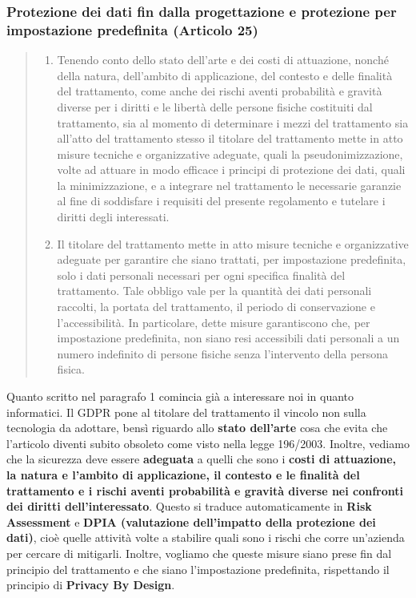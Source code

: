 \subsubsection*{Protezione dei dati fin dalla progettazione e protezione per impostazione predefinita (Articolo 25)}
\begin{quote}
    \begin{enumerate}
        \item Tenendo conto dello stato dell'arte e dei costi di attuazione, nonché della natura, dell'ambito di applicazione, del contesto e delle finalità del trattamento, come anche dei rischi aventi probabilità e gravità diverse per i diritti e le libertà delle persone fisiche costituiti dal trattamento, sia al momento di determinare i mezzi del trattamento sia all'atto del trattamento stesso il titolare del trattamento mette in atto misure tecniche e organizzative adeguate, quali la pseudonimizzazione, volte ad attuare in modo efficace i principi di protezione dei dati, quali la minimizzazione, e a integrare nel trattamento le necessarie garanzie al fine di soddisfare i requisiti del presente regolamento e tutelare i diritti degli interessati.
        \item Il titolare del trattamento mette in atto misure tecniche e organizzative adeguate per garantire che siano trattati, per impostazione predefinita, solo i dati personali necessari per ogni specifica finalità del trattamento. Tale obbligo vale per la quantità dei dati personali raccolti, la portata del trattamento, il periodo di conservazione e l'accessibilità. In particolare, dette misure garantiscono che, per impostazione predefinita, non siano resi accessibili dati personali a un numero indefinito di persone fisiche senza l'intervento della persona fisica.
    \end{enumerate}
\end{quote}

Quanto scritto nel paragrafo 1 comincia già a interessare noi in quanto informatici.
Il GDPR pone al titolare del trattamento il vincolo non sulla tecnologia da adottare, bensì riguardo allo \textbf{stato dell'arte} cosa che evita che l'articolo diventi subito obsoleto come visto nella legge 196/2003.
Inoltre, vediamo che la sicurezza deve essere \textbf{adeguata} a quelli che sono i \textbf{costi di attuazione, la natura e l'ambito di applicazione, il contesto e le finalità del trattamento e i rischi aventi probabilità e gravità diverse nei confronti dei diritti dell'interessato}.
Questo si traduce automaticamente in \textbf{Risk Assessment} e \textbf{DPIA (valutazione dell'impatto della protezione dei dati)}, cioè quelle attività volte a stabilire quali sono i rischi che corre un'azienda per cercare di mitigarli.
Inoltre, vogliamo che queste misure siano prese fin dal principio del trattamento e che siano l'impostazione predefinita, rispettando il principio di \textbf{Privacy By Design}.
